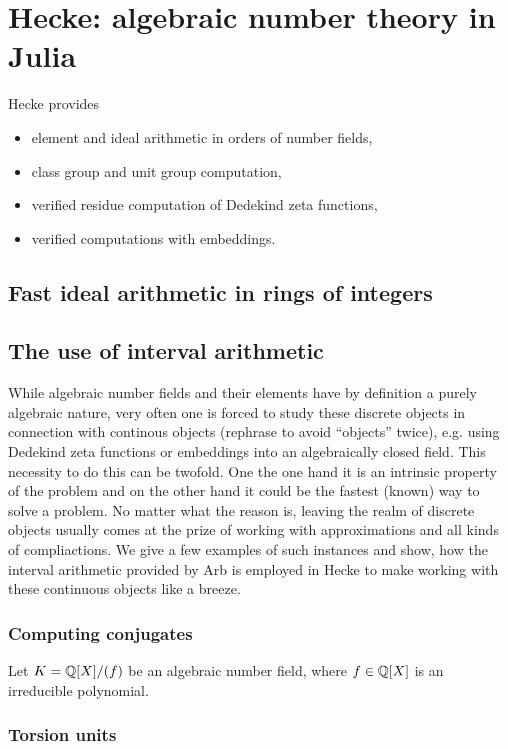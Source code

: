 \documentclass{sig-alternate-05-2015}
\begin{document}
\section{Hecke: algebraic number theory in Julia}

Hecke provides
\begin{itemize}
\item
  element and ideal arithmetic in orders of number fields,
\item
  class group and unit group computation,
\item
  verified residue computation of Dedekind zeta functions,
\item
  verified computations with embeddings.
\end{itemize}

\subsection{Fast ideal arithmetic in rings of integers}

\subsection{The use of interval arithmetic}

While algebraic number fields and their elements have by definition a purely algebraic nature, very often one is forced to study these discrete objects in connection with continous objects (rephrase to avoid ``objects'' twice), e.g. using Dedekind zeta functions or embeddings into an algebraically closed field.
This necessity to do this can be twofold. One the one hand it is an intrinsic property of the problem and on the other hand it could be the fastest (known) way to solve a problem.
No matter what the reason is, leaving the realm of discrete objects usually comes at the prize of working with approximations and all kinds of compliactions.
We give a few examples of such instances and show, how the interval arithmetic provided by Arb is employed in Hecke to make working with these continuous objects like a breeze.

\subsubsection{Computing conjugates}

Let $K = \mathbb{Q}[X]/(f)$ be an algebraic number field, where $f \in \mathbb{Q}[X]$ is an irreducible polynomial.

\subsubsection{Torsion units}
\end{document}

